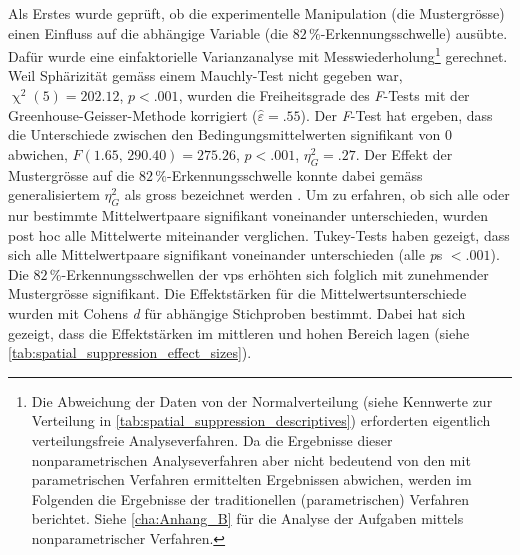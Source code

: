 \documentclass[11pt, twoside, a4paper]{book}		%
\begin{document}
Als Erstes wurde geprüft, ob die experimentelle Manipulation (die Mustergrösse) einen Einfluss auf die abhängige Variable (die $82\,\%$-Er\-ken\-nungs\-schwel\-le) ausübte. Dafür wurde eine einfaktorielle Varianzanalyse mit Messwiederholung\footnote{Die Abweichung der Daten von der Normalverteilung (siehe Kennwerte zur Verteilung in \autoref{tab:spatial_suppression_descriptives}) erforderten eigentlich verteilungsfreie Analyseverfahren. Da die Ergebnisse dieser nonparametrischen Analyseverfahren aber nicht bedeutend von den mit parametrischen Verfahren ermittelten Ergebnissen abwichen, werden im Folgenden die Ergebnisse der traditionellen (parametrischen) Verfahren berichtet. Siehe \autoref{cha:Anhang_B} für die Analyse der Aufgaben mittels nonparametrischer Verfahren.}
gerechnet. Weil Sphärizität gemäss einem Mauchly-Test nicht gegeben war, $\upchi^2(5)=202.12$, $p<.001$, wurden die Freiheitsgrade des \textit{F}-Tests mit der Greenhouse-Geisser-Methode korrigiert ($\hat{\varepsilon}=.55$).
Der \textit{F}-Test hat ergeben, dass die Unterschiede zwischen den Bedingungsmittelwerten signifikant von 0 abwichen, $F(1.65,\,290.40)=275.26$, $p<.001$, $\eta_{G}^2=.27$. Der Effekt der Mustergrösse auf die $82\,\%$-Erkennungsschwelle konnte dabei gemäss generalisiertem $\eta_{G}^2$ \citep{Olejnik2003} als gross bezeichnet werden \citep[S. 383]{Bakeman2005}.
Um zu erfahren, ob sich alle oder nur bestimmte Mittelwertpaare signifikant voneinander unterschieden, wurden post hoc alle Mittelwerte miteinander verglichen.
Tukey-Tests haben gezeigt, dass sich alle Mittelwertpaare signifikant voneinander unterschieden (alle \textit{p}s $<.001$).
Die $82\,\%$-Er\-ken\-nungs\-schwel\-len der \glspl{vp} erhöhten sich folglich mit zunehmender Mustergrösse signifikant.
Die Effektstärken für die Mittelwertsunterschiede wurden mit Cohens \textit{d} für abhängige Stichproben \citep{Gibbons1993} bestimmt. 
Dabei hat sich gezeigt, dass die Effektstärken im mittleren und hohen Bereich \citep[][S. 40]{Cohen1988} lagen (siehe \autoref{tab:spatial_suppression_effect_sizes}). 
\end{document}
